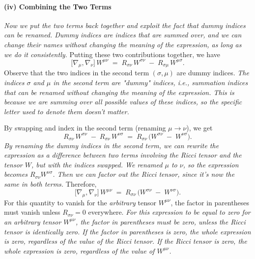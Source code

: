 \paragraph{(iv) Combining the Two Terms}
\textit{Now we put the two terms back together and exploit the fact that dummy indices can be renamed. Dummy indices are indices that are summed over, and we can change their names without changing the meaning of the expression, as long as we do it consistently.}
Putting these two contributions together, we have
\[
\bigl[\nabla_{\mu}, \nabla_{\nu}\bigr]\,W^{\mu\nu}
\;=\;
R_{\sigma\nu}\,W^{\sigma\nu}
\;-\;
R_{\sigma\mu}\,W^{\mu\sigma}.
\]
Observe that the two indices in the second term $(\sigma,\mu)$ are dummy indices.
\textit{The indices \(\sigma\) and \(\mu\) in the second term are "dummy" indices, i.e., summation indices that can be renamed without changing the meaning of the expression. This is because we are summing over all possible values of these indices, so the specific letter used to denote them doesn't matter.}

By swapping and index in the second term (renaming $\mu\to\nu$), we get
\[
R_{\sigma\nu}\,W^{\sigma\nu}
\;-\;
R_{\sigma\nu}\,W^{\nu\sigma}
\;=\;
R_{\sigma\nu}\,
\bigl(W^{\sigma\nu} \;-\; W^{\nu\sigma}\bigr).
\]
\textit{By renaming the dummy indices in the second term, we can rewrite the expression as a difference between two terms involving the Ricci tensor and the tensor \(W\), but with the indices swapped. We renamed \(\mu\) to \(\nu\), so the expression becomes \(R_{\sigma\nu}W^{\nu\sigma}\). Then we can factor out the Ricci tensor, since it's now the same in both terms.}
Therefore,
\[
\bigl[\nabla_{\mu}, \nabla_{\nu}\bigr]\,W^{\mu\nu} \;=\;
R_{\sigma\nu}\,\bigl(W^{\sigma\nu} \;-\; W^{\nu\sigma}\bigr).
\]
For this quantity to vanish for the \emph{arbitrary} tensor $W^{\mu\nu}$, the factor in parentheses must vanish unless $R_{\sigma\nu}=0$ everywhere.
\textit{For this expression to be equal to zero for an arbitrary tensor \(W^{\mu\nu}\), the factor in parentheses must be zero, unless the Ricci tensor is identically zero. If the factor in parentheses is zero, the whole expression is zero, regardless of the value of the Ricci tensor. If the Ricci tensor is zero, the whole expression is zero, regardless of the value of \(W^{\mu\nu}\).}

